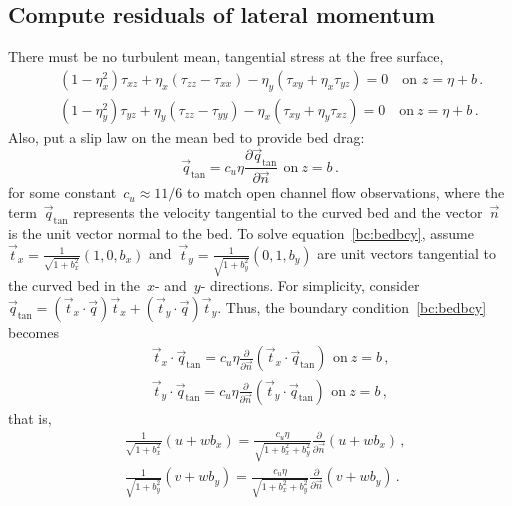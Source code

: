 \documentclass[12pt,a5paper]{article}
\begin{document}
\subsection{Compute residuals of lateral momentum}

There must be no turbulent mean, tangential stress at the free surface,
\begin{eqnarray}&&
    (1-\eta_x^2)\tau_{xz}+\eta_x(\tau_{zz}-\tau_{xx})-\eta_y(\tau_{xy}+\eta_x\tau_{yz})=0
    \quad\text{on } z=\eta+b\,.
    \label{bc:ttx} \\&&
    (1-\eta_y^2)\tau_{yz}+\eta_y(\tau_{zz}-\tau_{yy})
    -\eta_x(\tau_{xy}+\eta_y\tau_{xz})=0
    \quad\text{on}\ z=\eta+b\,.
    \label{bc:tty}
\end{eqnarray}
Also, put a slip law on the mean bed to provide bed drag: 
\begin{equation}
\vec q_{\text{tan}}=c_u\eta\frac{\partial\vec q_{\text{tan}}}{\partial\vec n}\,\ \text{on}\ z=b\,.
\label{bc:bedbcy}
\end{equation} 
for some constant~$c_u\approx 11/6$ to match open channel flow observations, where the term~$\vec q_{\text{tan}}$ represents the velocity tangential to the curved bed and the vector~$\vec n$ is the unit vector normal to the bed. To solve equation~\eqref{bc:bedbcy}, assume~$\vec t_x=\frac{1}{\sqrt{1+b_x^2}}(1,0,b_x)$ and~$\vec t_y=\frac{1}{\sqrt{1+b_y^2}}(0,1,b_y)$ are unit vectors tangential to the curved bed in the~$x$- and~$y$- directions. For simplicity, consider~$\vec q_{\text{tan}}=(\vec t_x\cdot\vec q)\vec t_x+(\vec t_y\cdot\vec q)\vec t_y$. Thus, the boundary condition~\eqref{bc:bedbcy} becomes
\begin{eqnarray*}
&&\vec t_x\cdot\vec q_{\text{tan}}=c_u\eta\frac{\partial}{\partial\vec n}(\vec t_x\cdot\vec q_{\text{tan}})\,\ \text{on}\ z=b\,,\\
&&\vec t_y\cdot\vec q_{\text{tan}}=c_u\eta\frac{\partial}{\partial\vec n}(\vec t_y\cdot\vec q_{\text{tan}})\,\ \text{on}\ z=b\,,
\end{eqnarray*}
that is,
\begin{align}&
\frac{1}{\sqrt{1+b_x^2}}(u+wb_x)=\frac{c_u\eta}{\sqrt{1+b_x^2+b_y^2}}\frac{\partial}{\partial\vec n}(u+wb_x)\,,\label{slip:u}\\&
\frac{1}{\sqrt{1+b_y^2}}(v+wb_y)=\frac{c_u\eta}{\sqrt{1+b_x^2+b_y^2}}\frac{\partial}{\partial\vec n}(v+wb_y)\,.\label{slip:v}
\end{align}
\end{document}
